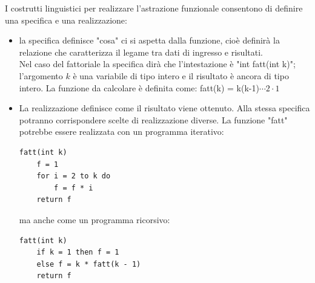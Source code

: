 \documentclass[12pt]{report}
\begin{document}
	I costrutti linguistici per realizzare l'astrazione funzionale consentono di definire una specifica e una realizzazione:
	\begin{itemize}
		\item la specifica definisce "cosa" ci si aspetta dalla funzione, cioè definirà la relazione che caratterizza il legame tra dati di ingresso e risultati. \\
		Nel caso del fattoriale la specifica dirà che l'intestazione è "int fatt(int k)"; l'argomento $k$ è una variabile di tipo intero e il risultato è ancora di tipo intero. La funzione da calcolare è definita come: fatt(k) = k(k-1)$\cdots 2 \cdot 1$
		\item La realizzazione definisce come il risultato viene ottenuto. Alla stessa specifica potranno corrispondere scelte di realizzazione diverse. La funzione "fatt" potrebbe essere realizzata con un programma iterativo:
		\begin{lstlisting}[style=pascalstyle]
fatt(int k)
	f = 1
	for i = 2 to k do
		f = f * i
	return f
\end{lstlisting}
		ma anche come un programma ricorsivo:
		\begin{lstlisting}[style=pascalstyle]
fatt(int k)
	if k = 1 then f = 1
	else f = k * fatt(k - 1)
	return f
\end{lstlisting}
	\end{itemize}
\end{document}
